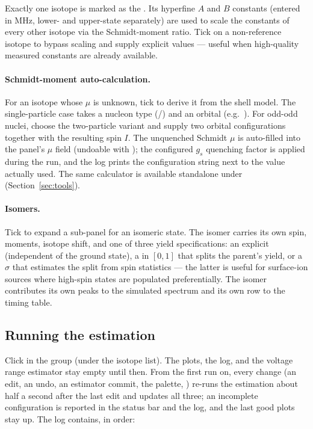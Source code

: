 Exactly one isotope is marked as the . Its hyperfine
$A$ and $B$ constants (entered in MHz, lower- and upper-state
separately) are used to scale the constants of every other isotope
via the Schmidt-moment ratio. Tick  on a
non-reference isotope to bypass scaling and supply explicit values ---
useful when high-quality measured constants are already available.

\paragraph{Schmidt-moment auto-calculation.}
For an isotope whose $\mu$ is unknown, tick 
to derive it from the shell model. The single-particle case takes a
nucleon type (/) and an orbital (e.g.\ ).
For odd-odd nuclei, choose the two-particle variant and supply two
orbital configurations together with the resulting spin $I$. The
unquenched Schmidt $\mu$ is auto-filled into the panel's $\mu$ field
(undoable with ); the configured $g_s$ quenching factor
is applied during the run, and the log prints the configuration
string next to the value actually used. The same calculator is
available standalone under  (Section~\ref{sec:tools}).

\paragraph{Isomers.}
Tick  to expand a sub-panel for an isomeric state.
The isomer carries its own spin, moments, isotope shift, and one of
three yield specifications: an explicit  (independent of
the ground state), a  in $[0,1]$ that splits
the parent's yield, or a  $\sigma$ that
estimates the split from spin statistics --- the latter is useful for
surface-ion sources where high-spin states are populated
preferentially. The isomer contributes its own peaks to the simulated
spectrum and its own row to the timing table.

\subsection{Running the estimation}

Click  in the  group (under the isotope
list). The plots, the log, and the voltage range estimator stay empty
until then. From the first run on, every change (an edit, an undo, an
estimator commit, the palette, ) re-runs the
estimation about half a second after the last edit and updates all
three; an incomplete configuration is reported in the status bar and
the log, and the last good plots stay up. The log contains, in order:

